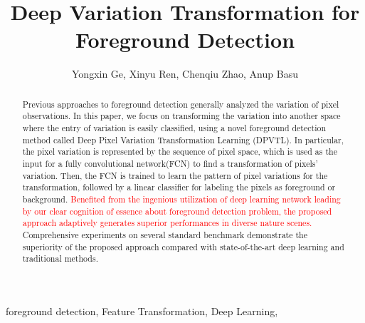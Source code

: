 \documentclass[journal]{IEEEtran}
\begin{document}
\title{Deep Variation Transformation for Foreground Detection}

\author{Yongxin Ge, 
        Xinyu Ren, 
        Chenqiu Zhao,
        Anup Basu}




\maketitle



\begin{abstract}
%
Previous approaches to foreground detection generally analyzed the variation of pixel observations.
In this paper, we focus on transforming the variation into another space where the entry of variation is easily classified, using a novel foreground detection method called Deep Pixel Variation Transformation Learning (DPVTL).
In particular, the pixel variation is represented by the sequence of pixel space, which is used as the input for a fully convolutional network(FCN) to find a transformation of pixels' variation.
Then, the FCN is trained to learn the pattern of pixel variations for the transformation, followed by a linear classifier for labeling the pixels as foreground or background.
%    
    \textcolor{red}{
Benefited from the ingenious utilization of deep learning network leading by our clear cognition of essence about foreground detection problem,
    the proposed approach adaptively generates superior performances in diverse nature scenes.}
%
Comprehensive experiments on several standard benchmark demonstrate the superiority of the proposed approach compared with state-of-the-art deep learning and traditional methods.
%
\end{abstract}

\begin{IEEEkeywords} 
    foreground detection, Feature Transformation, Deep Learning,
\end{IEEEkeywords}
\end{document}
